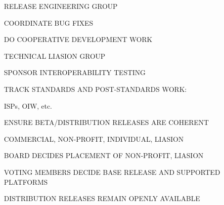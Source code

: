 \begin{bwslide}

\begin{nrtc}
\item	RELEASE ENGINEERING GROUP
    \begin{nrtc}
    \item	COORDINATE BUG FIXES

    \item	DO COOPERATIVE DEVELOPMENT WORK
    \end{nrtc}

\item	TECHNICAL LIASION GROUP
    \begin{nrtc}
    \item	SPONSOR INTEROPERABILITY TESTING

    \item	TRACK STANDARDS AND POST-STANDARDS WORK:
	\begin{nrtc}
	\item	ISPs, OIW, etc.
	\end{nrtc}
    \end{nrtc}

\item	ENSURE BETA/DISTRIBUTION RELEASES ARE COHERENT
\end{nrtc}
\end{bwslide}


\begin{bwslide}

\begin{nrtc}
\item	COMMERCIAL, NON-PROFIT, INDIVIDUAL, LIASION

\item	BOARD DECIDES PLACEMENT OF NON-PROFIT, LIASION

\item	VOTING MEMBERS DECIDE BASE RELEASE AND SUPPORTED PLATFORMS

\item	DISTRIBUTION RELEASES REMAIN OPENLY AVAILABLE
\end{nrtc}
\end{bwslide}
